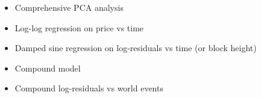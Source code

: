 \begin{itemize}
    \item Comprehensive PCA analysis
    \item Log-log regression on price vs time
    \item Damped sine regression on log-residuals vs time (or block height)
    \item Compound model
    \item Compound log-residuals vs world events
\end{itemize}
